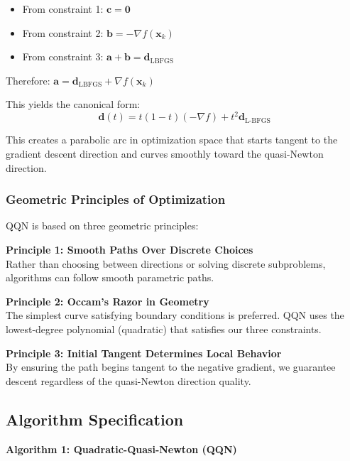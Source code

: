 \begin{itemize}
\tightlist
\item
  From constraint 1: \(\mathbf{c} = \mathbf{0}\)
\item
  From constraint 2: \(\mathbf{b} = -\nabla f(\mathbf{x}_k)\)
\item
  From constraint 3: \(\mathbf{a} + \mathbf{b} = \mathbf{d}_{\text{LBFGS}}\)
\end{itemize}

Therefore: \(\mathbf{a} = \mathbf{d}_{\text{LBFGS}} + \nabla f(\mathbf{x}_k)\)

This yields the canonical form:
\[\mathbf{d}(t) = t(1-t)(-\nabla f) + t^2 \mathbf{d}_{\text{L-BFGS}}\]

This creates a parabolic arc in optimization space that starts tangent to the gradient descent direction and curves smoothly toward the quasi-Newton direction.

\hypertarget{geometric-principles-of-optimization}{%
\subsubsection{Geometric Principles of Optimization}\label{geometric-principles-of-optimization}}

QQN is based on three geometric principles:

\textbf{Principle 1: Smooth Paths Over Discrete Choices}\\
Rather than choosing between directions or solving discrete subproblems, algorithms can follow smooth parametric paths.

\textbf{Principle 2: Occam's Razor in Geometry}\\
The simplest curve satisfying boundary conditions is preferred. QQN uses the lowest-degree polynomial (quadratic) that satisfies our three constraints.

\textbf{Principle 3: Initial Tangent Determines Local Behavior}\\
By ensuring the path begins tangent to the negative gradient, we guarantee descent regardless of the quasi-Newton direction quality.

\hypertarget{algorithm-specification}{%
\subsection{Algorithm Specification}\label{algorithm-specification}}

\textbf{Algorithm 1: Quadratic-Quasi-Newton (QQN)}

